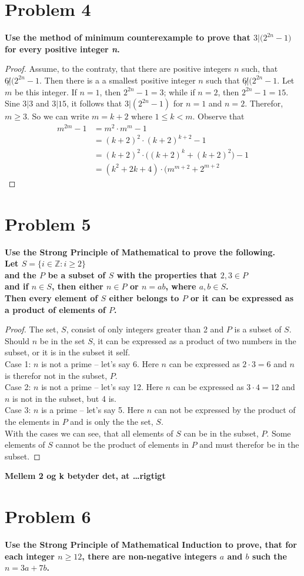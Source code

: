 \documentclass[english,11pt,a4paper]{article}
\begin{document}
\section*{Problem 4}
\textbf{Use the method of minimum counterexample to prove that $3|\Big(2^{2n}-1\Big)$ for every positive integer \textit{n}.}
\begin{proof}
Assume, to the contraty, that there are positive integers $n$ such, that $6\not |(2^{2n}-1$. Then there is a a smallest positive integer $n$ such that $6\not |(2^{2n}-1$.
Let $m$ be this integer.
If $n=1$, then $2^{2n}-1 =3$; while if $n=2$, then $2^{2n}-1=15$.
Sine $3|3$ and $3|15$, it follows that $3|(2^{2n}-1)$ for $n=1$ and $n=2$. Therefor, $m\geq 3$. So we can write $m=k+2$ where $1\leq k< m$. Observe that
\begin{align}
m^{2m}-1 &= m^2\cdot m^m -1 \\
	&= (k+2)^2 \cdot (k+2)^{k+2} -1 \\
	&= (k+2)^2 \cdot \Big((k+2)^k+(k+2)^2\Big)-1 \\
	&= (k^2+2k+4)\cdot (m^{m+2}+2^{m+2}
\end{align}
\end{proof}


\section*{Problem 5}
\textbf{Use the Strong Principle of Mathematical to prove the following.\\
Let $S= \{ i \in \mathbb{Z} : i \geq 2\}$ \\
and the $P$ be a subset of $S$ with the properties that $2,3 \in P$ \\
and if $n \in S$, then either $n \in P$ or $n=ab$, where $a,b\in S$. \\
Then every element of $S$ either belongs to $P$ or it can be expressed as a product of elements of $P$.}
\begin{proof}
The set, $S$, consist of only integers greater than 2 and $P$ is a subset of $S$.
Should $n$ be in the set $S$, it can be expressed as a product of two numbers in the subset, or it is in the subset it self.
\\
Case 1: $n$ is not a prime -- let's say 6. Here $n$ can be expressed as $2 \cdot 3 = 6$ and $n$ is therefor not in the subset, $P$.
\\
Case 2: $n$ is not a prime -- let's say 12. Here $n$ can be expressed as $3 \cdot 4 = 12$ and $n$ is not in the subset, but 4 is.
\\
Case 3: $n$ is a prime -- let's say 5. Here $n$ can not be expressed by the product of the elements in $P$ and is only the the set, $S$.
\\
With the cases we can see, that all elements of $S$ can be in the subset, $P$. 
Some elements of $S$ cannot be the product of elements in $P$ and must therefor be in the subset.
\end{proof}

\textbf{Mellem 2 og k betyder det, at \dots rigtigt}



\section*{Problem 6}
\textbf{Use the Strong Principle of Mathematical Induction to prove, that for each integer $n\geq 12$, there are non-negative integers $a$ and $b$ such the $n=3a+7b$.}
\end{document}
